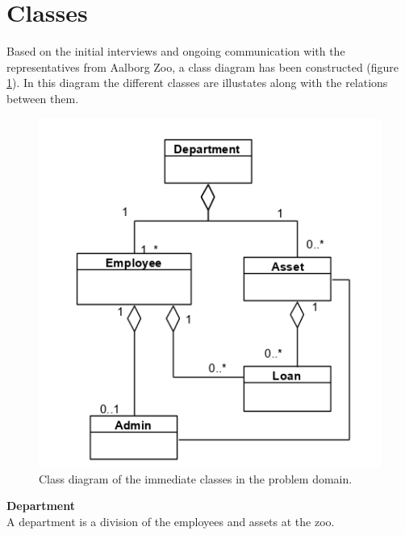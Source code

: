 \section{Classes} \label{sc:classes}
Based on the initial interviews and ongoing communication with the representatives from Aalborg Zoo, a class diagram has been constructed (figure \ref{fig:FirstPDClassDiagram}). In this diagram the different classes are illustates along with the relations between them. 

\begin{figure}[H]
    \centering
    \includegraphics[width=1.0\textwidth]{figures/PDDiagramV4.png}
    \caption{Class diagram of the immediate classes in the problem domain.}
    \label{fig:FirstPDClassDiagram}
\end{figure}


\textbf{Department}\\
A department is a division of the employees and assets at the zoo.

